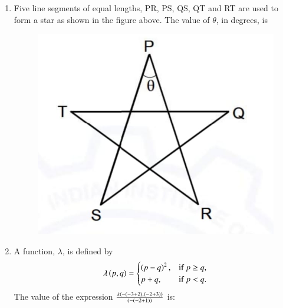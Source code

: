 \documentclass[journal,12pt,onecolumn]{article}
\theoremstyle{remark}
\begin{document}
\begin{enumerate}
\item Five line segments of equal lengths, PR, PS, QS, QT and RT are used to form a star as shown in the figure  above.
The value of $\theta$, in degrees, is \underline{\hspace{2cm}}
\begin{figure}[H]
    \centering
    \includegraphics[width=0.7\columnwidth]{figs/1q8.jpg}
    \caption{}
    \label{fig:q8}
\end{figure}
\hfill{}
\begin{enumerate}
\end{enumerate}

\item A function, $\lambda$, is defined by
\begin{align}
\lambda\left(p,q\right) = 
\begin{cases}
    \left(p-q\right)^2, & \text{if } p \geq q, \\
    p+q, & \text{if } p < q.
\end{cases}
\end{align}
The value of the expression $\frac{\lambda\left(-\left(-3+2\right), \left(-2+3\right)\right)}{\left(-\left(-2+1\right)\right)}$ is:

\hfill{}
\begin{enumerate}
\end{enumerate}


\end{enumerate}
\end{document}
